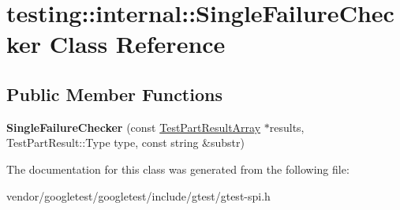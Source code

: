 \hypertarget{classtesting_1_1internal_1_1SingleFailureChecker}{}\section{testing\+:\+:internal\+:\+:Single\+Failure\+Checker Class Reference}
\label{classtesting_1_1internal_1_1SingleFailureChecker}
\subsection*{Public Member Functions}
\begin{DoxyCompactItemize}
\item 
{\bfseries Single\+Failure\+Checker} (const \hyperlink{classtesting_1_1TestPartResultArray}{Test\+Part\+Result\+Array} $\ast$results, Test\+Part\+Result\+::\+Type type, const string \&substr)\hypertarget{classtesting_1_1internal_1_1SingleFailureChecker_a6d350d385526c97c9982e928f5f8fb56}{}\label{classtesting_1_1internal_1_1SingleFailureChecker_a6d350d385526c97c9982e928f5f8fb56}

\end{DoxyCompactItemize}


The documentation for this class was generated from the following file\+:\begin{DoxyCompactItemize}
\item 
vendor/googletest/googletest/include/gtest/gtest-\/spi.\+h\end{DoxyCompactItemize}
